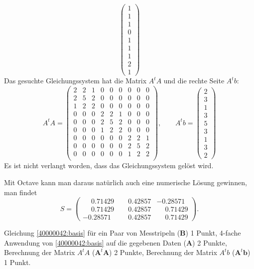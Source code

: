 \begin{loesung}
\[\begin{pmatrix}
1\\1\\1\\
0\\1\\1\\
1\\2\\1
\end{pmatrix}
\]
Das gesuchte Gleichungssystem hat die Matrix $A^tA$ und die rechte
Seite $A^tb$:
\[
A^tA
=
\begin{pmatrix}
2&2&1&0&0&0&0&0&0\\
2&5&2&0&0&0&0&0&0\\
1&2&2&0&0&0&0&0&0\\
%
0&0&0&2&2&1&0&0&0\\
0&0&0&2&5&2&0&0&0\\
0&0&0&1&2&2&0&0&0\\
%
0&0&0&0&0&0&2&2&1\\
0&0&0&0&0&0&2&5&2\\
0&0&0&0&0&0&1&2&2\\
\end{pmatrix}
,\qquad
A^tb=\begin{pmatrix}2\\3\\1\\3\\5\\3\\1\\3\\2\end{pmatrix}
\]
Es ist nicht verlangt worden, dass das Gleichungssystem gelöst wird.
\end{loesung}

\begin{diskussion}
Mit Octave kann man daraus natürlich auch eine numerische Lösung gewinnen,
man findet
\[
S=\begin{pmatrix}
\phantom{-}0.71429& \phantom{-}0.42857&           -0.28571\\
\phantom{-}0.71429& \phantom{-}0.42857& \phantom{-}0.71429\\
          -0.28571& \phantom{-}0.42857& \phantom{-}0.71429
\end{pmatrix}.
\]
\end{diskussion}

\begin{bewertung}
Gleichung \eqref{40000042:basis} für ein Paar von Messtripeln ({\bf B})
1 Punkt,
4-fache Anwendung von \eqref{40000042:basis} auf die gegebenen Daten ({\bf A})
2 Punkte,
Berechnung der Matrix $A^tA$ ($\textbf{A}^t\textbf{A}$) 2 Punkte,
Berechnung der Matrix $A^tb$ ($\textbf{A}^t\textbf{b}$) 1 Punkt.

\end{bewertung}


